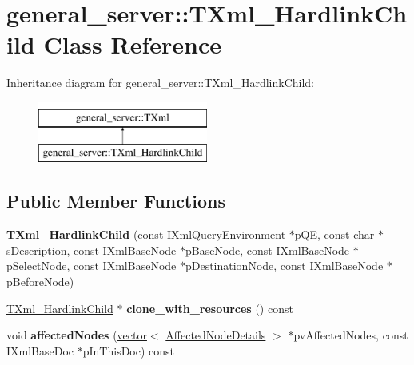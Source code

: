 \hypertarget{classgeneral__server_1_1TXml__HardlinkChild}{\section{general\-\_\-server\-:\-:\-T\-Xml\-\_\-\-Hardlink\-Child \-Class \-Reference}
\label{classgeneral__server_1_1TXml__HardlinkChild}
}
\-Inheritance diagram for general\-\_\-server\-:\-:\-T\-Xml\-\_\-\-Hardlink\-Child\-:\begin{figure}[H]
\begin{center}
\leavevmode
\includegraphics[height=2.000000cm]{classgeneral__server_1_1TXml__HardlinkChild}
\end{center}
\end{figure}
\subsection*{\-Public \-Member \-Functions}
\begin{DoxyCompactItemize}
\item 
\hypertarget{classgeneral__server_1_1TXml__HardlinkChild_a2154dfc32fb8c8065ae6cfc04c6da32d}{{\bfseries \-T\-Xml\-\_\-\-Hardlink\-Child} (const \-I\-Xml\-Query\-Environment $\ast$p\-Q\-E, const char $\ast$s\-Description, const \-I\-Xml\-Base\-Node $\ast$p\-Base\-Node, const \-I\-Xml\-Base\-Node $\ast$p\-Select\-Node, const \-I\-Xml\-Base\-Node $\ast$p\-Destination\-Node, const \-I\-Xml\-Base\-Node $\ast$p\-Before\-Node)}\label{classgeneral__server_1_1TXml__HardlinkChild_a2154dfc32fb8c8065ae6cfc04c6da32d}

\item 
\hypertarget{classgeneral__server_1_1TXml__HardlinkChild_a1839063bc6fceb15d801e59c98269722}{\hyperlink{classgeneral__server_1_1TXml__HardlinkChild}{\-T\-Xml\-\_\-\-Hardlink\-Child} $\ast$ {\bfseries clone\-\_\-with\-\_\-resources} () const }\label{classgeneral__server_1_1TXml__HardlinkChild_a1839063bc6fceb15d801e59c98269722}

\item 
\hypertarget{classgeneral__server_1_1TXml__HardlinkChild_a40ed8105b27ba6fbf6a8387a32820854}{void {\bfseries affected\-Nodes} (\hyperlink{classvector}{vector}$<$ \hyperlink{structgeneral__server_1_1TXml_1_1AffectedNodeDetails}{\-Affected\-Node\-Details} $>$ $\ast$pv\-Affected\-Nodes, const \-I\-Xml\-Base\-Doc $\ast$p\-In\-This\-Doc) const }\label{classgeneral__server_1_1TXml__HardlinkChild_a40ed8105b27ba6fbf6a8387a32820854}

\end{DoxyCompactItemize}
